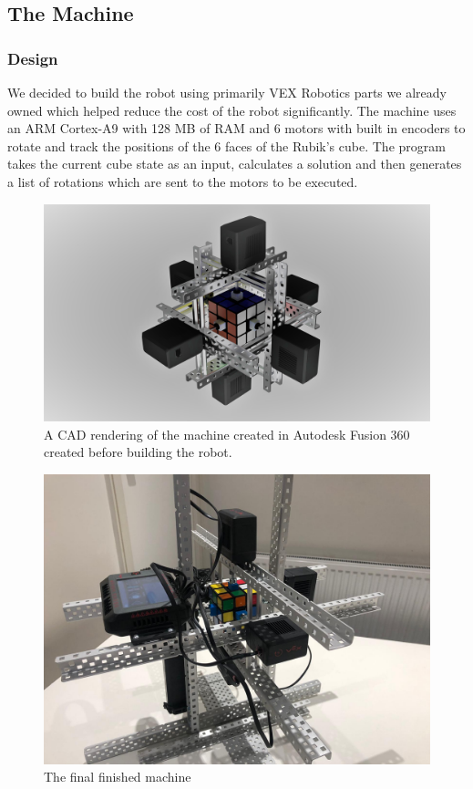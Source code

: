 \documentclass[8pt]{article}
\begin{document}
\subsection{The Machine}

\subsubsection{Design} 

We decided to build the robot using primarily VEX Robotics parts we already owned which helped
reduce the cost of the robot significantly. The machine uses an ARM Cortex-A9 with 
128 MB of RAM and 6 motors with built in encoders to rotate and track the
positions of the 6 faces of the Rubik's cube. The program takes the current cube state 
as an input, calculates a solution and then generates a list of rotations which are sent 
to the motors to be executed.
    

\begin{minipage}{0.45\textwidth}
\begin{figure}[H]
\centering
\includegraphics[scale=0.05]{main cad.jpg}
\caption{A CAD rendering of the machine created in Autodesk Fusion 360 created 
before building the robot.}
\end{figure}
\end{minipage}%
\hfill
\begin{minipage}{0.45\textwidth}
\begin{figure}[H]
\centering
\includegraphics[scale=0.11]{final machine.jpg}
\caption{The final finished machine}
\end{figure}    
\end{minipage}
\end{document}
